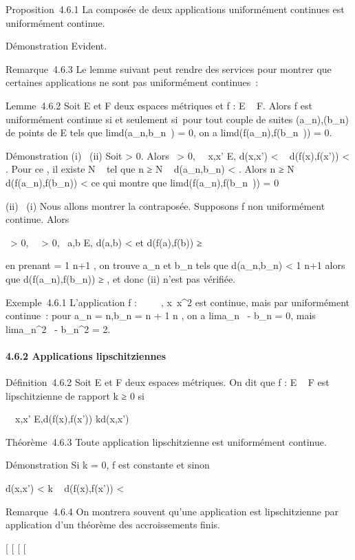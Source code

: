 \documentclass[]{article}
\begin{document}
Proposition~4.6.1 La composée de deux applications uniformément
continues est uniformément continue.

Démonstration Evident.

Remarque~4.6.3 Le lemme suivant peut rendre des services pour montrer
que certaines applications ne sont pas uniformément continues~:

Lemme~4.6.2 Soit E et F deux espaces métriques et f : E \rightarrow~ F. Alors f est
uniformément continue si et seulement si~pour tout couple de suites
(a\_n),(b\_n) de points de E tels que
limd(a\_n,b\_n~) = 0, on a
limd(f(a\_n),f(b\_n~)) = 0.

Démonstration (i) \rigtharrow~(ii) Soit \epsilon \textgreater{} 0. Alors
\exists~\eta \textgreater{} 0,\quad
\forall~~x,x' \in E, d(x,x') \textless{} \eta \rigtharrow~
d(f(x),f(x')) \textless{} \epsilon. Pour ce \eta, il existe N \in {}~ tel que n ≥ N \rigtharrow~
d(a\_n,b\_n) \textless{} \eta. Alors n ≥ N \rigtharrow~
d(f(a\_n),f(b\_n)) \textless{} \epsilon ce qui montre que
limd(f(a\_n),f(b\_n~)) = 0

(ii) \rigtharrow~(i) Nous allons montrer la contraposée. Supposons f non
uniformément continue. Alors

\exists~\epsilon \textgreater{} 0,
\forall~~\eta \textgreater{} 0,\quad
\exists~a,b \in E, d(a,b) \textless{}
\eta\text et d(f(a),f(b)) ≥ \epsilon

en prenant \eta = 1 \over n+1 , on trouve a\_n
et b\_n tels que d(a\_n,b\_n) \textless{} 1
\over n+1 alors que d(f(a\_n),f(b\_n))
≥ \epsilon, et donc (ii) n'est pas vérifiée.

Exemple~4.6.1 L'application f : ~ \rightarrow~ ~,
x\mapsto~x^2 est continue, mais par
uniformément continue~: pour a\_n = n,b\_n = n + 1
\over n , on a
lim\textbar{}a\_n~ -
b\_n\textbar{} = 0, mais
lim\textbar{}a\_n^2~ -
b\_n^2\textbar{} = 2.

\paragraph{4.6.2 Applications lipschitziennes}

Définition~4.6.2 Soit E et F deux espaces métriques. On dit que f : E \rightarrow~
F est lipschitzienne de rapport k ≥ 0 si

\forall~~x,x' \in E,\quad d(f(x),f(x')) \leq
kd(x,x')

Théorème~4.6.3 Toute application lipschitzienne est uniformément
continue.

Démonstration Si k = 0, f est constante et sinon

d(x,x') \textless{} \epsilon \over k \rigtharrow~ d(f(x),f(x'))
\textless{} \epsilon

Remarque~4.6.4 On montrera souvent qu'une application est lipschitzienne
par application d'un théorème des accroissements finis.

{[}
{[}
{[}
{[}
\end{document}
